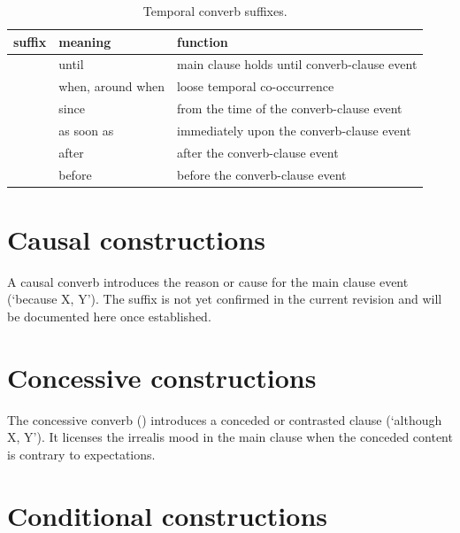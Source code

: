\begin{table}[ht]
	\footnotesize
	\caption{Temporal converb suffixes.}\label{tab:tempconverbs}
	\medskip
	\begin{tabularx}{0.9\textwidth}{L l L}
		\toprule
		{\sc suffix} & {\sc meaning} & {\sc function} \\
		\midrule
		    & until              & main clause holds until converb-clause event \\
		  & when, around when  & loose temporal co-occurrence \\
		    & since              & from the time of the converb-clause event \\
		 & as soon as         & immediately upon the converb-clause event \\
		  & after              & after the converb-clause event \\
		    & before             & before the converb-clause event \\
		\bottomrule
	\end{tabularx}
\end{table}

\section{Causal constructions}\label{sec:causal}


A causal converb introduces the reason or cause for the main clause event (`because X, Y'). The suffix is not yet confirmed in the current revision and will be documented here once established.

\section{Concessive constructions}\label{sec:concessive}

The concessive converb () introduces a conceded or contrasted clause (`although X, Y'). It licenses the irrealis mood in the main clause when the conceded content is contrary to expectations.

\section{Conditional constructions}\label{sec:conditional}

